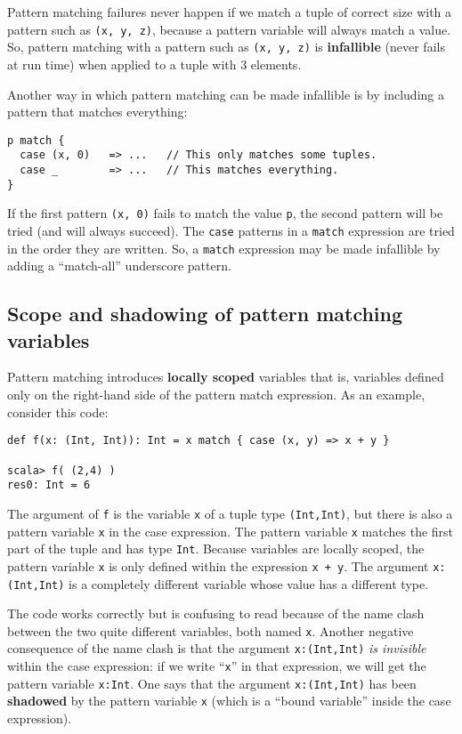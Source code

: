 Pattern matching failures never happen if we match a tuple of correct
size with a pattern such as \lstinline!(x, y, z)!, because a pattern
variable will always match a value. So, pattern matching with a pattern
such as \lstinline!(x, y, z)! is \textbf{infallible}
(never fails at run time) when applied to a tuple with $3$ elements.

Another way in which pattern matching can be made infallible is by
including a pattern that matches everything:
\begin{lstlisting}
p match {
  case (x, 0)   => ...   // This only matches some tuples.
  case _        => ...   // This matches everything.
}
\end{lstlisting}
If the first pattern \lstinline!(x, 0)! fails to match the value
\lstinline!p!, the second pattern will be tried (and will always
succeed). The \lstinline!case! patterns in a \lstinline!match! expression
are tried in the order they are written. So, a \lstinline!match!
expression may be made infallible by adding a ``match-all'' underscore
pattern.

\subsection{Scope and shadowing of pattern matching variables\label{subsec:Scope-and-shadowing-variables}}

Pattern matching introduces \textbf{locally scoped}
variables \textemdash{} that is, variables defined only on the right-hand
side of the pattern match expression. As an example, consider this
code:
\begin{lstlisting}
def f(x: (Int, Int)): Int = x match { case (x, y) => x + y }

scala> f( (2,4) )
res0: Int = 6
\end{lstlisting}
The argument of \lstinline!f! is the variable \lstinline!x! of a
tuple type \lstinline!(Int,Int)!, but there is also a pattern variable
\lstinline!x! in the case expression. The pattern variable \lstinline!x!
matches the first part of the tuple and has type \lstinline!Int!.
Because variables are locally scoped, the pattern variable \lstinline!x!
is only defined within the expression \lstinline!x + y!. The argument
\lstinline!x:(Int,Int)! is a completely different variable whose
value has a different type.

The code works correctly but is confusing to read because of the name
clash between the two quite different variables, both named \lstinline!x!.
Another negative consequence of the name clash is that the argument
\lstinline!x:(Int,Int)! \emph{is invisible} within the case expression:
if we write ``\lstinline!x!'' in that expression, we will get the
pattern variable \lstinline!x:Int!. One says that the argument \lstinline!x:(Int,Int)!
has been \textbf{shadowed} by the pattern variable
\lstinline!x! (which is a ``bound variable''
inside the case expression).

